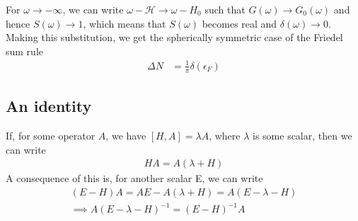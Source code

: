 \documentclass[twoside,11pt]{report}
\numberwithin{equation}{section}
\begin{document}
For \(\omega \to -\infty\), we can write \(\omega - \mathcal{H} \to \omega - H_0\) such that \(G(\omega) \to G_0(\omega)\) and hence \(S(\omega) \to 1\), which means that \(S(\omega)\) becomes real and \(\delta(\omega) \to 0\). Making this substitution, we get the spherically symmetric case of the Friedel sum rule
\begin{equation}\begin{aligned}
	\Delta N &= \frac{1}{\pi}\delta(\epsilon_F)
\end{aligned}\end{equation}

\subsection{An identity}
If, for some operator \(A\), we have \(\left[H,A\right] = \lambda A\), where \(\lambda\) is some scalar, then we can write
\begin{equation}\begin{aligned}
HA = A(\lambda+H)
\end{aligned}\end{equation}
A consequence of this is, for another scalar E, we can write
\begin{gather}
	(E - H)A = AE - A(\lambda+H) = A\left(E -\lambda -H\right) \\
\implies A(E - \lambda - H)^{-1} = (E-H)^{-1}A\label{identity}
\end{gather}
\end{document}

